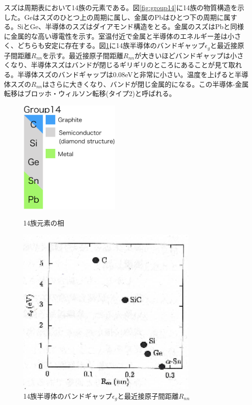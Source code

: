スズは周期表において14族の元素である。図\ref{fig:group14}に14族の物質構造を示した。Geはスズのひとつ上の周期に属し、金属のPbはひとつ下の周期に属する。SiとGe、半導体のスズはダイアモンド構造をとる。金属のスズはPbと同様に金属的な高い導電性を示す。室温付近で金属と半導体のエネルギー差は小さく、どちらも安定に存在する。図\ref{fig:bandgaps}に14族半導体のバンドギャップ$\epsilon_g$と最近接原子間距離$R_{nn}$を示す\cite{Yonezawa}。最近接原子間距離$R_{nn}$が大きいほどバンドギャップは小さくなり、半導体スズはバンドが閉じるギリギリのところにあることが見て取れる。半導体スズのバンドギャップは0.08eVと非常に小さい。温度を上げると半導体スズの$R_{nn}$はさらに大きくなり、バンドが閉じ金属的になる。この半導体-金属転移はブロッホ・ウィルソン転移(タイプ2)と呼ばれる\cite{Yonezawa}。

\begin{figure}[!h]
 \begin{minipage}{0.4\hsize}
  \begin{center}
   \includegraphics[width=50mm]{Introduction/group14.eps}
  \end{center}
  \caption{14族元素の相}
  \label{fig:group14}
 \end{minipage}
 \begin{minipage}{0.6\hsize}
  \begin{center}
   \includegraphics[width=90mm]{Introduction/bandgaps.eps}
  \end{center}
  \caption{14族半導体のバンドギャップ$\epsilon_g$と最近接原子間距離$R_{nn}$\cite{Yonezawa}}
  \label{fig:bandgaps}
 \end{minipage}
\end{figure}


